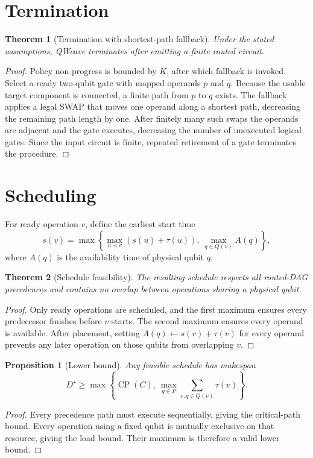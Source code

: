 \documentclass[11pt]{article}
\newtheorem{theorem}{Theorem}
\newtheorem{proposition}{Proposition}
\begin{document}
\section{Termination}
\begin{theorem}[Termination with shortest-path fallback]
Under the stated assumptions, QWeave terminates after emitting a finite routed circuit.
\end{theorem}
\begin{proof}
Policy non-progress is bounded by $K$, after which fallback is invoked. Select a ready two-qubit gate with mapped operands $p$ and $q$. Because the usable target component is connected, a finite path from $p$ to $q$ exists. The fallback applies a legal SWAP that moves one operand along a shortest path, decreasing the remaining path length by one. After finitely many such swaps the operands are adjacent and the gate executes, decreasing the number of unexecuted logical gates. Since the input circuit is finite, repeated retirement of a gate terminates the procedure.
\end{proof}

\section{Scheduling}
For ready operation $v$, define the earliest start time
\begin{equation}
s(v)=\max\left\{\max_{u\prec v}(s(u)+\tau(u)),\ \max_{q\in Q(v)}A(q)\right\},
\end{equation}
where $A(q)$ is the availability time of physical qubit $q$.

\begin{theorem}[Schedule feasibility]
The resulting schedule respects all routed-DAG precedences and contains no overlap between operations sharing a physical qubit.
\end{theorem}
\begin{proof}
Only ready operations are scheduled, and the first maximum ensures every predecessor finishes before $v$ starts. The second maximum ensures every operand is available. After placement, setting $A(q)\leftarrow s(v)+\tau(v)$ for every operand prevents any later operation on those qubits from overlapping $v$.
\end{proof}

\begin{proposition}[Lower bound]
Any feasible schedule has makespan
\begin{equation}
D^\star\ge \max\left\{\operatorname{CP}(C),\ \max_{q\in P}\sum_{v:q\in Q(v)}\tau(v)\right\}.
\end{equation}
\end{proposition}
\begin{proof}
Every precedence path must execute sequentially, giving the critical-path bound. Every operation using a fixed qubit is mutually exclusive on that resource, giving the load bound. Their maximum is therefore a valid lower bound.
\end{proof}
\end{document}
